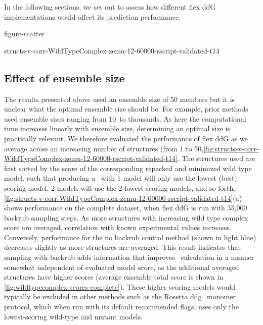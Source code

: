 In the following sections, we set out to assess how different flex ddG implementations would affect its prediction performance.

{figure-scatter}

{structs-v-corr-WildTypeComplex-zemu-12-60000-rscript-validated-t14}

\subsection{Effect of ensemble size}

The results presented above used an ensemble size of 50 members but it is unclear what the optimal ensemble size should be. For example, prior methods used ensemble sizes ranging from 10\cite{kamisetty_accounting_2011}\ to thousands\cite{benedix_predicting_2009}. As here the computational time increases linearly with ensemble size, determining an optimal size is practically relevant. We therefore evaluated the performance of flex ddG as we average across an increasing number of structures (from 1 to 50,\cref{fig:structs-v-corr-WildTypeComplex-zemu-12-60000-rscript-validated-t14}.
The structures used are first sorted by the score of the corresponding repacked and minimized wild type model, such that producing a \ddg\ with 1 model will only use the lowest (best) scoring model, 2 models will use the 2 lowest scoring models, and so forth.
\cref{fig:structs-v-corr-WildTypeComplex-zemu-12-60000-rscript-validated-t14}(a) shows performance on the complete dataset, when flex ddG is run with 35,000 backrub sampling steps.
As more structures with increasing wild type complex score are averaged, correlation with known experimental values increases.
Conversely, performance for the no backrub control method (shown in light blue) decreases slightly as more structures are averaged.
This result indicates that sampling with backrub adds information that improves \ddg\ calculation in a manner somewhat independent of evaluated model score, as the additional averaged structures have higher scores (average ensemble total score is shown in \cref{fig:wildtypecomplex-scores-complete}).
These higher scoring models would typically be excluded in other methods such as the Rosetta ddg\_monomer protocol, which when run with its default recommended flags, uses only the lowest-scoring wild-type and mutant models.

